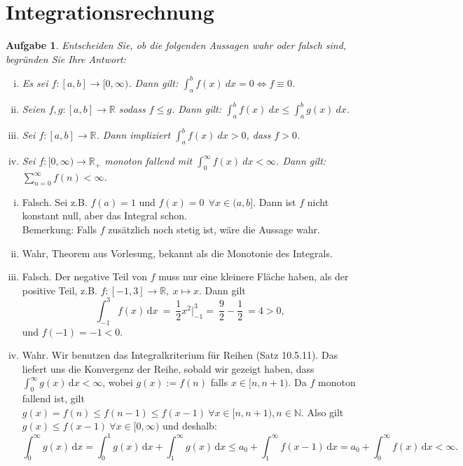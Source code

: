 \documentclass[a4paper, 20]{exam}
\newtheorem{ex}{Aufgabe}
\newcommand\RR{\mathbb{R}}
\newcommand\NN{\mathbb{N}}
\begin{document}
\newpage
\section{Integrationsrechnung}


\begin{ex} Entscheiden Sie, ob die folgenden Aussagen wahr oder falsch sind, begründen Sie Ihre Antwort: 
\begin{enumerate}[i)]
\item Es sei $f: [a,b] \longrightarrow [0, \infty)$. Dann gilt: $\displaystyle \int_a^bf(x)~dx = 0 \iff f \equiv 0$. 
\item Seien $f,g : [a,b] \longrightarrow \mathbb{R}$ sodass $f \leq g$. Dann gilt: $\displaystyle \int_a^b f(x)~dx \leq \int_a^b g(x) ~dx$.
\item Sei $f: [a,b] \longrightarrow \mathbb{R}$. Dann impliziert $\displaystyle \int_a^b f(x) ~dx >0$, dass $f>0$. 
\item Sei $f:[0, \infty) \longrightarrow \mathbb{R}_+$ monoton fallend mit $\displaystyle \int_0^\infty f(x) ~dx < \infty$. Dann gilt: $\displaystyle \sum_{n=0}^\infty f(n) < \infty$.
\end{enumerate}
\end{ex}


\begin{solution}
\begin{enumerate}[i.)]
\item 
Falsch. Sei z.B. $f(a)=1$ und $f(x)=0 ~~ \forall x \in (a,b]$. Dann ist $f$ nicht konstant null, aber das Integral schon.\\
Bemerkung: Falls $f$ zusätzlich noch stetig ist, wäre die Aussage wahr.

\item
Wahr, Theorem aus Vorlesung, bekannt als die Monotonie des Integrals. 

\item
Falsch. Der negative Teil von $f$ muss nur eine kleinere Fläche haben, als der positive Teil, z.B. $f:[-1,3] \longrightarrow \RR, ~ x \longmapsto x$. Dann gilt
$$\int_{-1}^3 \! f(x) \, \mathrm{d}x ~=~ \frac{1}{2}x^2 \Big|^3_{-1} = ~\frac{9}{2} - \frac{1}{2} ~= 4 >0,$$
und $f(-1)=-1 <0$.

\item
Wahr. Wir benutzen das Integralkriterium für Reihen (Satz 10.5.11). Das liefert uns die Konvergenz der Reihe, sobald wir gezeigt haben, dass $\int_{0}^{\infty} \! g(x) \, \mathrm{d}x < \infty$, wobei $g(x):=f(n)$ falls $x \in [n,n+1)$. Da $f$ monoton fallend ist, gilt $g(x) = f(n) \leq f(n-1) \leq f(x-1) ~ \forall x \in [n,n+1), n\in \NN$. Also gilt $g(x) \leq f(x-1)  ~ \forall x \in [0,\infty)$ und deshalb: $$\int_{0}^{\infty} \! g(x) \, \mathrm{d}x
=\int_{0}^{1} \! g(x) \, \mathrm{d}x + \int_{1}^{\infty} \! g(x) \, \mathrm{d}x
 \leq  a_0 +  \int_{1}^{\infty} \! f(x-1) \, \mathrm{d}x
 = a_0 +  \int_{0}^{\infty} \! f(x) \, \mathrm{d}x <\infty.$$
\end{enumerate}
\end{solution}
\end{document}

